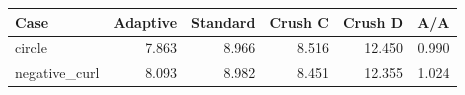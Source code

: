 \begin{tabular}{lrrrrr}
\toprule
Case & Adaptive & Standard & Crush C & Crush D & A/A \\
\midrule
circle & 7.863 & 8.966 & 8.516 & 12.450 & 0.990 \\
negative\_curl & 8.093 & 8.982 & 8.451 & 12.355 & 1.024 \\
\bottomrule
\end{tabular}
